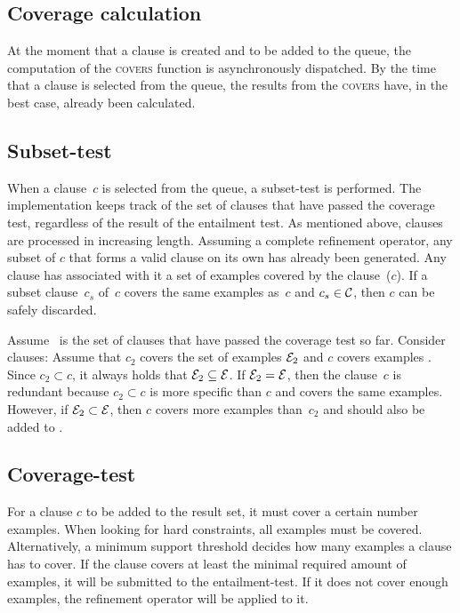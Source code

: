 \subsection{Coverage calculation}
At the moment that a clause is created and to be added to the queue, the computation of the \textsc{covers} function is asynchronously dispatched.
By the time that a clause is selected from the queue, the results from the \textsc{covers} have, in the best case, already been calculated.

\subsection{Subset-test}
When a clause~$c$ is selected from the queue, a subset-test is performed.
The implementation keeps track of the set of clauses  that have passed the coverage test, regardless of the result of the entailment test.
As mentioned above, clauses are processed in increasing length.
Assuming a complete refinement operator, any subset of $c$ that forms a valid clause on its own has already been generated.
Any clause has associated with it a set of examples covered by the clause~($c$).
If a subset clause~$c_s$ of~$c$ covers the same examples as~$c$ and $c_s \in \mathcal{C}$, then $c$ can be safely discarded.

\begin{example}
	Assume~ is the set of clauses that have passed the coverage test so far. Consider clauses:
	Assume that $c_2$ covers the set of examples $_2$ and $c$ covers examples \sym{E}.
	Since $c_2 \subset c$, it always holds that $\mathcal{E}_2 \subseteq \mathcal{E}$.
	If $\mathcal{E}_2 = \mathcal{E}$, then the clause~$c$ is redundant because $c_2 \subset c$ is more specific than $c$ and covers the same examples.
	However, if $\mathcal{E}_2 \subset \mathcal{E}$, then $c$ covers more examples than~$c_2$ and should also be added to .
\end{example}

\subsection{Coverage-test}
For a clause $c$ to be added to the result set, it must cover a certain number examples.
When looking for hard constraints, all examples must be covered.
Alternatively, a minimum support threshold decides how many examples a clause has to cover.
If the clause covers at least the minimal required amount of examples, it will be submitted to the entailment-test.
If it does not cover enough examples, the refinement operator will be applied to it.

